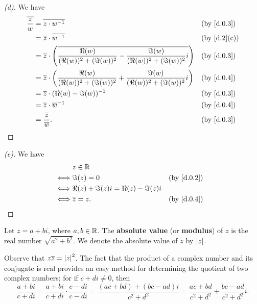 \begin{proof}[(d)]
  We have
  \begin{align*}
    \conj{\frac{z}{w}} & = \conj{z \cdot w^{-1}}                                                                                        &  & \by{d.0.3}  \\
                       & = \conj{z} \cdot \conj{w^{-1}}                                                                                 &  & \by{d.2}[c] \\
                       & = \conj{z} \cdot \pa{\conj{\frac{\Re(w)}{(\Re(w))^2 + (\Im(w))^2} - \frac{\Im(w)}{(\Re(w))^2 + (\Im(w))^2} i}} &  & \by{d.0.3}  \\
                       & = \conj{z} \cdot \pa{\frac{\Re(w)}{(\Re(w))^2 + (\Im(w))^2} + \frac{\Im(w)}{(\Re(w))^2 + (\Im(w))^2} i}        &  & \by{d.0.4}  \\
                       & = \conj{z} \cdot (\Re(w) - \Im(w))^{-1}                                                                        &  & \by{d.0.3}  \\
                       & = \conj{z} \cdot \conj{w}^{-1}                                                                                 &  & \by{d.0.4}  \\
                       & = \frac{\conj{z}}{\conj{w}}.                                                                                   &  & \by{d.0.3}
  \end{align*}
\end{proof}

\begin{proof}[(e)]
  We have
  \begin{align*}
         & z \in \R                                              \\
    \iff & \Im(z) = 0                            &  & \by{d.0.2} \\
    \iff & \Re(z) + \Im(z) i = \Re(z) - \Im(z) i                 \\
    \iff & \conj{z} = z.                         &  & \by{d.0.4}
  \end{align*}
\end{proof}

\begin{defn}\label{d.0.5}
  Let \(z = a + bi\), where \(a, b \in \mathbb{R}\).
  The \textbf{absolute value} (or \textbf{modulus}) of \(z\) is the real number \(\sqrt{a^2 + b^2}\).
  We denote the absolute value of \(z\) by \(\left\lvert z\right\rvert\).

  Observe that \(z \overline{z} = \left\lvert z\right\rvert^2\).
  The fact that the product of a complex number and its conjugate is real provides an easy method for determining the quotient of two complex numbers;
  for if \(c + di \neq 0\), then
  \[
    \frac{a + bi}{c + di} = \frac{a + bi}{c + di} \cdot \frac{c - di}{c - di} = \frac{(ac + bd) + (bc - ad) i}{c^2 + d^2} = \frac{ac + bd}{c^2 + d^2} + \frac{bc - ad}{c^2 + d^2} i.
  \]
\end{defn}

